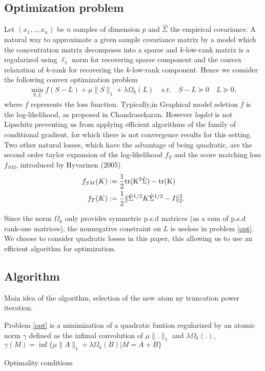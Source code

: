 \subsection{Optimization problem}
Let $(x_1,..,x_n)$ be $n$ samples of dimension $p$ and   $\hat{\Sigma}$ the empirical covariance. A natural way to approximate a given sample covariance matrix by a model which the concentration matrix decomposes into a sparse and $k$-low-rank matrix is a regularized using $\ell_1$ norm for recovering sparse component and the convex relaxation of $k$-rank for recovering the $k$-low-rank component. Hence we consider the following convex optimization problem
\begin{align}
\label{opt}
\min_{S,L} f(S-L)+\mu\|S\|_{1}+\lambda\Omega_k(L) \quad s.t. \quad S-L \succeq 0 \quad L \succeq 0,
\end{align}
where  $f$ represents the loss function. Typically,in Graphical model seletion $f$ is the log-likelihood, as proposed in Chandrasekaran. However \textit{logdet} is not Lipschitz preventing us from applying efficient algorithms of the family of conditional gradient, for which there is not convergence results for this setting.  Two other natural losses, which have the advantage of being quadratic, are the second order taylor expansion of the log-likelihood $f_{T}$ and the score matching loss $f_{SM}$, introduced by Hyvarinen (2005)
\begin{align}
f_{SM}(K)&:=\frac{1}{2}\rm tr(K^2 \hat{\Sigma})-\rm tr(K) \\
f_{T}(K)&:=\frac{1}{2}\|\hat{\Sigma}^{1/2}K\hat{\Sigma}^{1/2}-I\|_2^2.
\end{align}

Since the norm $\Omega_k$ only provides symmetric p.s.d matrices (as a sum of p.s.d rank-one matrices), the nonnegative constraint on $L$ is useless in problem \ref{opt}. 
We choose to consider quadratic losses in this paper, this allowing us to use an efficient algorithm for optimization.


\subsection{Algorithm}
Main idea of the algorithm, selection of the new atom ny truncation power iteration.

Problem \ref{opt} is a minimization of a quadratic funtion regularized by an atomic norm $\gamma$  defined as the infimal convolution of $\mu\|.\|_{1}$ and $\lambda\Omega_k(.)$, $\gamma(M)=\inf\{\mu\|A\|_{1}+\lambda\Omega_k(B)|M=A+B\}$

Optimality conditions


